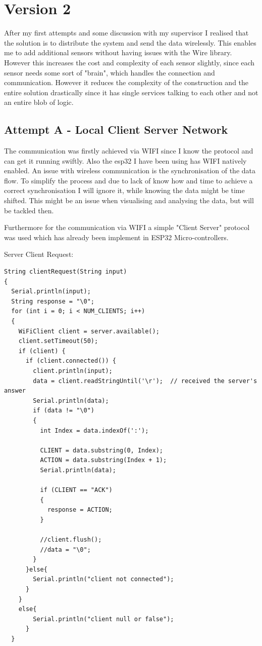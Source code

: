 \chapter*{Version 2}
\label{chap:Technical CHallenges}
\renewcommand{\thesection}{\arabic{section}}
\setcounter{section}{0}

After my first attempts and some discussion with my supervisor I realised that the solution is to distribute the system and send the data wirelessly. This enables me to add additional sensors without having issues with the Wire library. However this increases the cost and complexity of each sensor slightly, since each sensor needs some sort of "brain", which handles the connection and communication. 
However it reduces the complexity of the construction and the entire solution drastically since it has single services talking to each other and not an entire blob of logic. 

\section{Attempt A - Local Client Server Network}

The communication was firstly achieved via WIFI since I know the protocol and can get it running swiftly. Also the esp32 I have been using has WIFI natively enabled. 
An issue with wireless communication is the synchronisation of the data flow. To simplify the process and due to lack of know how and time to achieve a correct synchronisation I will ignore it, while knowing the data might be time shifted. 
This might be an issue when visualising and analysing the data, but will be tackled then.

Furthermore for the communication via WIFI a simple "Client Server" protocol was used which has already been implement in ESP32 Micro-controllers.\cite{arduinoi4:online} \cite{ESP32Ser71:online}

Server Client Request: 
\begin{lstlisting}
String clientRequest(String input)
{
  Serial.println(input);
  String response = "\0";
  for (int i = 0; i < NUM_CLIENTS; i++)
  {
    WiFiClient client = server.available();
    client.setTimeout(50);
    if (client) {
      if (client.connected()) {
        client.println(input);
        data = client.readStringUntil('\r');  // received the server's answer
        Serial.println(data);
        if (data != "\0")
        {
          int Index = data.indexOf(':');
        
          CLIENT = data.substring(0, Index);
          ACTION = data.substring(Index + 1);
          Serial.println(data);
   
          if (CLIENT == "ACK")
          {
            response = ACTION;
          }

          //client.flush();
          //data = "\0";
        }
      }else{
        Serial.println("client not connected");
      }
    }
    else{
        Serial.println("client null or false");
      }
  }
\end{lstlisting}

